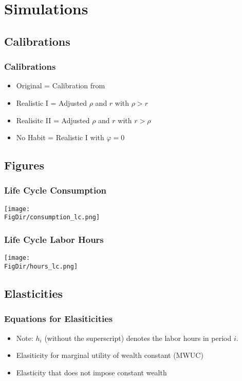 \documentclass[pdflatex]{beamer}
\providecommand{\TableDir}{\econtexRoot/Tables}
\begin{document}
\section{Simulations}
\subsection{Calibrations}
\begin{frame}
  \frametitle{Calibrations}
  
  \begin{itemize}
  \item Original = Calibration from \cite{bover1991relaxing}
  \item Realistic I = Adjusted $\rho$ and $r$ with $\rho > r$
  \item Realisitc II = Adjusted $\rho$ and $r$ with $r > \rho$
  \item No Habit = Realistic I with $\varphi=0$
  \end{itemize}
  
  \end{frame}

  \subsection{Figures}
  
  \begin{frame}
    \frametitle{Life Cycle Consumption}
    \begin{center}
\texttt{[image: \\FigDir/consumption\_lc.png]}
\end{center}
\end{frame}

    \begin{frame}
      \frametitle{Life Cycle Labor Hours}
      \begin{center}
      \texttt{[image: \\FigDir/hours\_lc.png]}
\end{center}
    \end{frame}
    \subsection{Elasticities}

    \begin{frame}
      \frametitle{Equations for Elasiticities}
      \begin{itemize}
      \item Note: $h_i$ (without the superscript) denotes the labor hours in period $i$.
      \item Elasiticity for marginal utility of wealth constant (MWUC)
        
      \item Elasticity that does not impose constant wealth
        
        \end{itemize}
    \end{frame}
    
\end{document}
